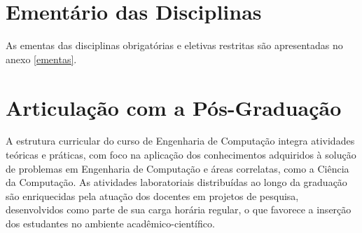 

\section{Ementário das Disciplinas}

As ementas das disciplinas obrigatórias e eletivas restritas são apresentadas no anexo \ref{ementas}.

\section{Articulação com a Pós-Graduação }

A estrutura curricular do curso de Engenharia de Computação integra atividades teóricas e práticas, com foco na aplicação dos conhecimentos adquiridos à solução de problemas em Engenharia de Computação e áreas correlatas, como a Ciência da Computação. As atividades laboratoriais distribuídas ao longo da graduação são enriquecidas pela atuação dos docentes em projetos de pesquisa, desenvolvidos como parte de sua carga horária regular, o que favorece a inserção dos estudantes no ambiente acadêmico-científico.

